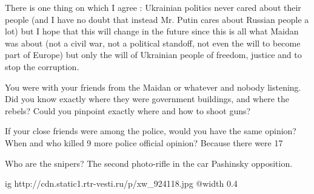 \begin{itemize}
\begin{itemize}
There
is one thing on which I agree : Ukrainian politics never cared about their
people (and I have no doubt that instead Mr. Putin cares about Russian people a
lot) but I hope that this will change in the future since this is all what
Maidan was about (not a civil war, not a political standoff, not even the will
to become part of Europe) but only the will of Ukrainian people of freedom,
justice and to stop the corruption.


You were with your friends from the Maidan or whatever and nobody listening.
Did you know exactly where they were government buildings, and where the
rebels? Could you pinpoint exactly where and how to shoot guns?

If your close friends were among the police, would you have the same opinion?
When and who killed 9 more police official opinion? Because there were 17


Who are the snipers? The second photo-rifle in the car Pashinsky opposition.

\ifcmt
  ig http://cdn.static1.rtr-vesti.ru/p/xw_924118.jpg
  @width 0.4
\fi



\end{itemize}
\end{itemize}
